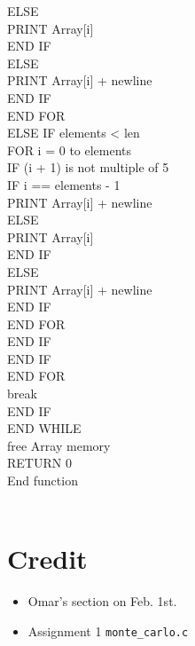 \documentclass[12pt]{article}
\begin{document}
\indent \indent \indent \indent \indent \indent \indent \indent ELSE \\
\indent \indent \indent \indent \indent \indent \indent \indent \indent PRINT Array[i] \\
\indent \indent \indent \indent \indent \indent \indent \indent END IF \\
\indent \indent \indent \indent \indent \indent \indent ELSE \\
\indent \indent \indent \indent \indent \indent \indent \indent PRINT Array[i] + newline \\
\indent \indent \indent \indent \indent \indent \indent END IF \\
\indent \indent \indent \indent \indent \indent END FOR \\
\indent \indent \indent \indent \indent ELSE IF elements < len \\
\indent \indent \indent \indent \indent \indent FOR i = 0 to elements \\
\indent \indent \indent \indent \indent \indent \indent IF (i + 1) is not multiple of 5 \\
\indent \indent \indent \indent \indent \indent \indent \indent IF i == elements - 1 \\
\indent \indent \indent \indent \indent \indent \indent \indent \indent PRINT Array[i] + newline \\
\indent \indent \indent \indent \indent \indent \indent \indent ELSE \\
\indent \indent \indent \indent \indent \indent \indent \indent \indent PRINT Array[i] \\
\indent \indent \indent \indent \indent \indent \indent \indent END IF \\
\indent \indent \indent \indent \indent \indent \indent ELSE \\
\indent \indent \indent \indent \indent \indent \indent \indent PRINT Array[i] + newline \\
\indent \indent \indent \indent \indent \indent \indent END IF \\
\indent \indent \indent \indent \indent \indent END FOR \\
\indent \indent \indent \indent \indent END IF \\
\indent \indent \indent \indent END IF \\
\indent \indent \indent END FOR \\
\indent \indent \indent break \\
\indent \indent END IF \\
\indent END WHILE \\
\indent free Array memory \\
\indent RETURN 0 \\
End function \\
\\
\section{Credit}

\begin{itemize}
  \item Omar's section on Feb. 1st.
  \item Assignment 1 \texttt{monte\_carlo.c}
\end{itemize}
\end{document}
